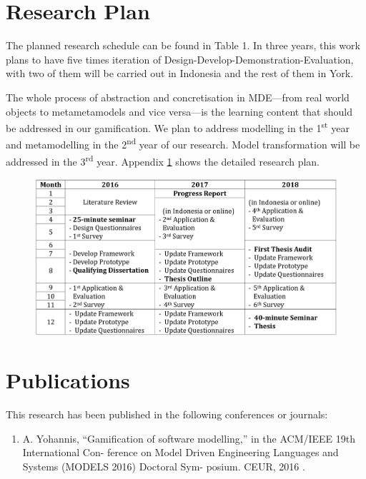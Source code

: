 \documentclass[12pt, a4paper]{report}
\begin{document}
\begin{appendices}

\chapter{Research Plan}
\label{Research Plan}
The planned research schedule can be found in Table 1. In three years, this work plans to have five times iteration of Design-Develop-Demonstration-Evaluation, with two of them will be carried out in Indonesia and the rest of them in York.

The whole process of abstraction and concretisation in MDE---from real world objects to metametamodels and vice versa---is the learning content that should be addressed in our gamification. We plan to address modelling in the 1\textsuperscript{st} year and metamodelling in the 2\textsuperscript{nd} year of our research. Model transformation will be addressed in the 3\textsuperscript{rd} year. Appendix \ref{Research Plan} shows the detailed research plan.

\begin {table}[ht]
\caption {Research Timetable} 
\end{table}
\begin{figure}[ht]
\centering
\includegraphics[width=\textwidth]{timetable}
\end{figure}

\chapter{Publications}
This research has been published in the following conferences or journals: 
\begin{enumerate}
 \item A. Yohannis, “Gamiﬁcation of software modelling,” in the ACM/IEEE 19th International Con-
ference on Model Driven Engineering Languages and Systems (MODELS 2016) Doctoral Sym-
posium. CEUR, 2016 \cite{Yohannis2016}.
\end{enumerate}


\end{appendices}
\end{document}
